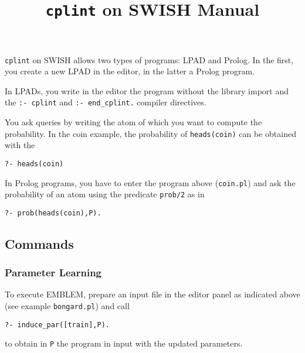 \documentclass[a4paper,10pt]{article}
\begin{document}
\title{\texttt{cplint} on SWISH Manual}
\maketitle

%





\verb|cplint| on SWISH allows two types of programs: LPAD and Prolog. In the first, you create a new LPAD in the editor, in the latter a Prolog program. 

In LPADs, you write in the editor the program without the library import and the \verb|:- cplint| and \verb|:- end_cplint.| compiler directives.

You ask queries by writing the atom of which you want to compute the probability. In the coin example, the probability of \verb|heads(coin)| can be obtained with the 
\begin{verbatim}
?- heads(coin)
\end{verbatim}

In Prolog programs, you have to enter the program above (\verb|coin.pl|) and ask the probability of an atom using the predicate \verb|prob/2| as in
\begin{verbatim}
?- prob(heads(coin),P).
\end{verbatim}





\subsection{Commands}
\subsubsection{Parameter Learning}
To execute EMBLEM, prepare an input file in the editor panel as indicated above 
(see example \verb|bongard.pl|) 
and call
\begin{verbatim}
?- induce_par([train],P).
\end{verbatim}
to obtain in \verb|P| the program in input with the updated parameters.
\end{document}
